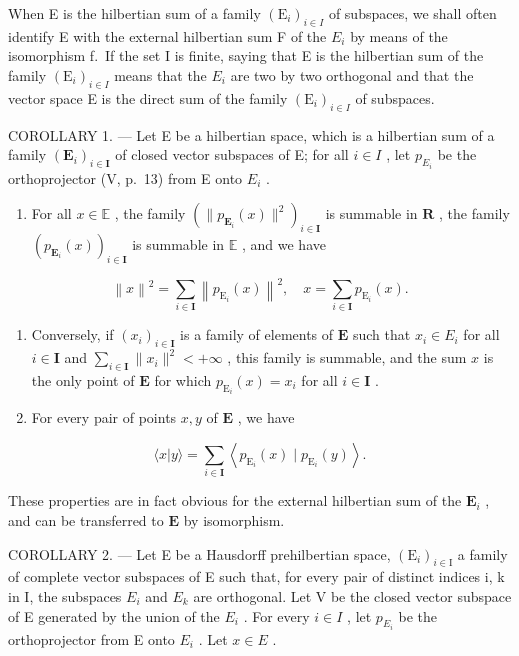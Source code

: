 When E is the hilbertian sum of a family \((\mathrm{E}_{i})_{i\in I}\) of subspaces, we shall often identify E with the external hilbertian sum F of the \(E_{i}\) by means of the isomorphism f.~If the set I is finite, saying that E is the hilbertian sum of the family \((\mathrm{E}_{i})_{i\in I}\) means that the \(E_{i}\) are two by two orthogonal and that the vector space E is the direct sum of the family \((\mathrm{E}_{i})_{i\in I}\) of subspaces.

COROLLARY 1. --- Let E be a hilbertian space, which is a hilbertian sum of a family \((\mathbf{E}_{i})_{i\in\mathbf{I}}\) of closed vector subspaces of E; for all \(i\in I\) , let \(p_{E_{i}}\) be the orthoprojector (V, p.~13) from E onto \(E_{i}\) .

\begin{enumerate}
\def\labelenumi{\alph{enumi})}
\tightlist
\item
  For all \(x \in \mathbb{E}\) , the family \((\| p_{\mathbf{E}_i}(x)\|^{2})_{i\in \mathbf{I}}\) is summable in \(\mathbf{R}\) , the family \((p_{\mathbf{E}_i}(x))_{i\in \mathbf{I}}\) is summable in \(\mathbb{E}\) , and we have
\end{enumerate}

\[
\left\| x \right\| ^ {2} = \sum_ {i \in \mathbf {I}} \left\| p _ {\mathrm{E} _ {i}} (x) \right\| ^ {2}, \quad x = \sum_ {i \in \mathbf {I}} p _ {\mathrm{E} _ {i}} (x).
\]

\begin{enumerate}
\def\labelenumi{\alph{enumi})}
\setcounter{enumi}{1}
\item
  Conversely, if \((x_{i})_{i\in \mathbf{I}}\) is a family of elements of \(\mathbf{E}\) such that \(x_{i}\in E_{i}\) for all \(i\in \mathbf{I}\) and \(\sum_{i\in \mathbf{I}}\| x_i\|^2 < + \infty\) , this family is summable, and the sum \(x\) is the only point of \(\mathbf{E}\) for which \(p_{\mathrm{E}_i}(x) = x_i\) for all \(i\in \mathbf{I}\) .
\item
  For every pair of points \(x, y\) of \(\mathbf{E}\) , we have
\end{enumerate}

\[
\langle x | y \rangle = \sum_ {i \in \mathbf {I}} \left\langle p _ {\mathrm{E} _ {i}} (x) \mid p _ {\mathrm{E} _ {i}} (y) \right\rangle .
\]

These properties are in fact obvious for the external hilbertian sum of the \(\mathbf{E}_i\) , and can be transferred to \(\mathbf{E}\) by isomorphism.

COROLLARY 2. --- Let E be a Hausdorff prehilbertian space, \((\mathrm{E}_{i})_{i\in\mathrm{I}}\) a family of complete vector subspaces of E such that, for every pair of distinct indices i, k in I, the subspaces \(E_{i}\) and \(E_{k}\) are orthogonal. Let V be the closed vector subspace of E generated by the union of the \(E_{i}\) . For every \(i\in I\) , let \(p_{E_{i}}\) be the orthoprojector from E onto \(E_{i}\) . Let \(x\in E\) .

